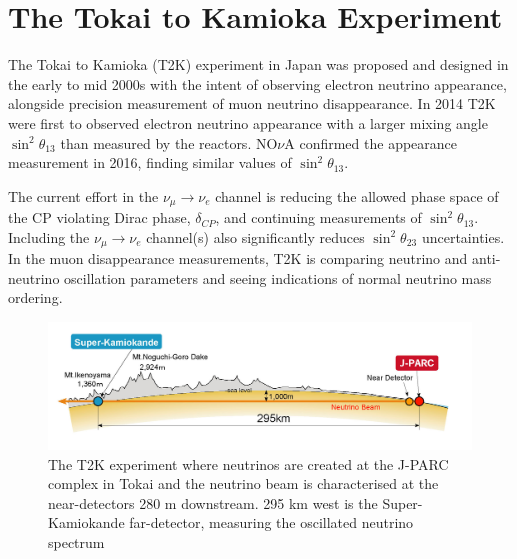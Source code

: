 \chapter{The Tokai to Kamioka Experiment}
\label{chap:detectors}
The Tokai to Kamioka (T2K) experiment in Japan was proposed and designed in the early to mid 2000s with the intent of observing electron neutrino appearance, alongside precision measurement of muon neutrino disappearance\cite{t2k_loi,t2k_prop}. In 2014 T2K were first to observed electron neutrino appearance with a larger mixing angle $\sin^2\theta_{13}$ than measured by the reactors\cite{t2k_disc}. NO$\nu$A confirmed the appearance measurement in 2016\cite{nova_disc}, finding similar values of $\sin^2\theta_{13}$.

The current effort in the $\nu_\mu \rightarrow \nu_e$ channel is reducing the allowed phase space of the CP violating Dirac phase, $\delta_{CP}$, and continuing measurements of $\sin^2 \theta_{13}$. Including the  $\nu_\mu \rightarrow \nu_e$ channel(s) also significantly reduces $\sin^2 \theta_{23}$ uncertainties\cite{nova_neutrino2018}. In the muon disappearance measurements, T2K is comparing neutrino and anti-neutrino oscillation parameters and seeing indications of normal neutrino mass ordering\cite{t2k_2017}.
\begin{figure}[h]
	\includegraphics[width=1.0\textwidth, trim={0mm 0mm 0mm 0mm}, clip,page=1]{figures/det_chap/view/t2k_overview}
	\caption{The T2K experiment where neutrinos are created at the J-PARC complex in Tokai and the neutrino beam is characterised at the near-detectors 280 m downstream. 295 km west is the Super-Kamiokande far-detector, measuring the oscillated neutrino spectrum}
	\label{fig:t2k_overview}
\end{figure}

